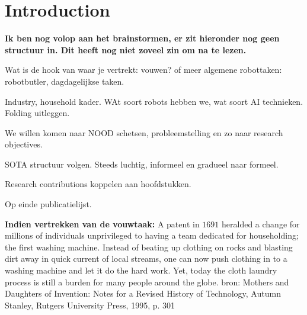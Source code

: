 \documentclass[\home/main.tex]{subfiles}
\begin{document}

\chapter{Introduction}\label{ch:introduction}


\textbf{\large{Ik ben nog volop aan het brainstormen, er zit hieronder nog geen structuur in. Dit heeft nog niet zoveel zin om na te lezen.}}

Wat is de hook van waar je vertrekt: vouwen? of meer algemene robottaken: robotbutler, dagdagelijkse taken.

Industry, household kader.
WAt soort robots hebben we, wat soort AI technieken. 
Folding uitleggen. 

We willen komen naar 
    NOOD schetsen, probleemstelling
    en zo naar research objectives. 


SOTA structuur volgen. Steeds luchtig, informeel en gradueel naar formeel.

Research contributions koppelen aan hoofdstukken. 

Op einde publicatielijst. 

\textbf{Indien vertrekken van de vouwtaak:}
A patent in $1691$ heralded a change for millions of individuals unprivileged to having a team dedicated for householding; the first washing machine. Instead of beating up clothing on rocks and blasting dirt away in quick current of local streams, one can now push clothing in to a washing machine and let it do the hard work. Yet, today the cloth laundry process is still a burden for many people around the globe. 
    bron: Mothers and Daughters of Invention: Notes for a Revised History of Technology, Autumn Stanley, Rutgers University Press, 1995, p. 301
\end{document}
